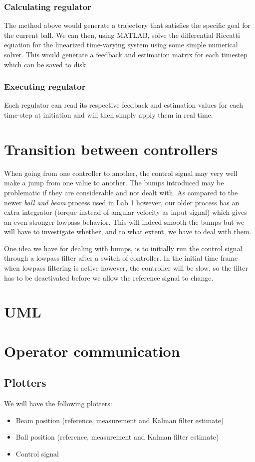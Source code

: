 \documentclass{article}
\begin{document}
\subsubsection{Calculating regulator}
The method above would generate a trajectory that satisfies the specific goal for the current ball. We can then, using MATLAB, solve the differential Riccatti equation for the linearized time-varying system using some simple numerical solver. This would generate a feedback and estimation matrix for each timestep which can be saved to disk.
\subsubsection{Executing regulator}
Each regulator can read its respective feedback and estimation values for each time-step at initiation and will then simply apply them in real time.

\section{Transition between controllers}
When going from one controller to another, the control signal may very well make a jump from one value to another. The bumps introduced may be problematic if they are considerable and not dealt with. As compared to the newer \emph{ball and beam} process used in Lab 1 however, our older process has an extra integrator (torque instead of angular velocity as input signal) which gives an even stronger lowpass behavior. This will indeed smooth the bumps but we will have to investigate whether, and to what extent, we have to deal with them.

One idea we have for dealing with bumps, is to initially run the control signal through a lowpass filter after a switch of controller. In the initial time frame when lowpass filtering is active however, the controller will be slow, so the filter has to be deactivated before we allow the reference signal to change.

\section{UML}


\section{Operator communication}
\subsection{Plotters}
We will have the following plotters:
\begin{itemize}
\item Beam position (reference, measurement and Kalman filter estimate)
\item Ball position (reference, measurement and Kalman filter estimate)
\item Control signal
\end{itemize}
\end{document}
